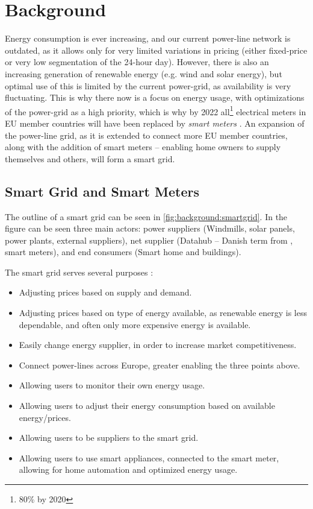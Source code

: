 \section{Background}
Energy consumption is ever increasing, and our current power-line network is outdated, as it allows only for very limited variations in pricing (either fixed-price or very low segmentation of the 24-hour day).
However, there is also an increasing generation of renewable energy (e.g. wind and solar energy), but optimal use of this is limited by the current power-grid, as availability is very fluctuating.
This is why there now is a focus on energy usage, with optimizations of the power-grid as a high priority, which is why by 2022 all\footnote{80\% by 2020} electrical meters in EU member countries will have been replaced by \textit{smart meters} \cite{smart_meter_survey} \cite{directive_2009_72_EC}.
An expansion of the power-line grid, as it is extended to connect more EU member countries, along with the addition of smart meters -- enabling home owners to supply themselves and others, will form a smart grid.

\subsection{Smart Grid and Smart Meters}
The outline of a smart grid can be seen in \cref{fig:background:smartgrid}.
In the figure can be seen three main actors: power suppliers (Windmills, solar panels, power plants, external suppliers), net supplier (Datahub -- Danish term from \cite{LOV_nr_575_af_18-06-2012}, smart meters), and end consumers (Smart home and buildings).

The smart grid serves several purposes \cite{smartgrid_gov} \cite{directive_2009_72_EC}:
\begin{itemize}
	\item Adjusting prices based on supply and demand.
	\item Adjusting prices based on type of energy available, as renewable energy is less dependable, and often only more expensive energy is available.
	\item Easily change energy supplier, in order to increase market competitiveness.
	\item Connect power-lines across Europe, greater enabling the three points above.
	\item Allowing users to monitor their own energy usage.
	\item Allowing users to adjust their energy consumption based on available energy/prices.
	\item Allowing users to be suppliers to the smart grid.
	\item Allowing users to use smart appliances, connected to the smart meter, allowing for home automation and optimized energy usage.
\end{itemize}

